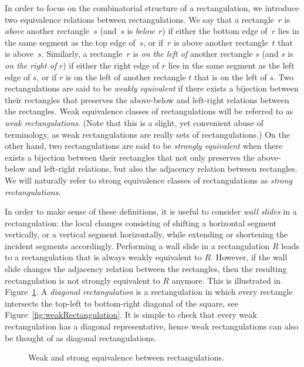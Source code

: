\documentclass{amsart}
\theoremstyle{definition}
\newcommand{\darkblue}{\color{darkblue}} %
\newcommand{\defn}[1]{\textsl{\darkblue #1}} %
\begin{document}
In order to focus on the combinatorial structure of a rectangulation, we introduce two equivalence relations between rectangulations.
We say that a rectangle~$r$ is \defn{above} another rectangle~$s$ (and~$s$ is \defn{below}~$r$) if either the bottom edge of~$r$ lies in the same segment as the top edge of~$s$, or if~$r$ is above another rectangle~$t$ that is above~$s$.
Similarly, a rectangle~$r$ is \defn{on the left of} another rectangle $s$ (and $s$ is \defn{on the right of} $r$) if either the right edge of $r$ lies in the same segment as the left edge of $s$, or if $r$ is on the left of another rectangle $t$ that is on the left of $s$.
Two rectangulations are said to be \defn{weakly equivalent} if there exists a bijection between their rectangles that preserves the above-below and left-right relations between the rectangles.
Weak equivalence classes of rectangulations will be referred to as \defn{weak rectangulations}.
(Note that this is a slight, yet convenient abuse of terminology, as weak rectangulations are really sets of rectangulations.)
On the other hand, two rectangulations are said to be \defn{strongly equivalent} when there exists a bijection between their rectangles that not only preserves the above-below and left-right relations, but also the adjacency relation between rectangles.
We will naturally refer to strong equivalence classes of rectangulations as \defn{strong rectangulations}.

In order to make sense of these definitions, it is useful to consider \defn{wall slides} in a rectangulation: the local changes consisting of shifting a horizontal segment vertically, or a vertical segment horizontally, while extending or shortening the incident segments accordingly.
Performing a wall slide in a rectangulation $R$ leads to a rectangulation that is always weakly equivalent to $R$.
However, if the wall slide changes the adjacency relation between the rectangles, then the resulting rectangulation is not strongly equivalent to $R$ anymore.
This is illustrated in Figure~\ref{fig:rectequiv}.
A \defn{diagonal rectangulation} is a rectangulation in which every rectangle intersects the top-left to bottom-right diagonal of the square, see Figure~\ref{fig:weakRectangulation}.
It is simple to check that every weak rectangulation has a diagonal representative, hence weak rectangulations can also be thought of as diagonal rectangulations.

\begin{figure}
	\caption{Weak and strong equivalence between rectangulations.}
	\label{fig:rectequiv}
\end{figure}
\end{document}
